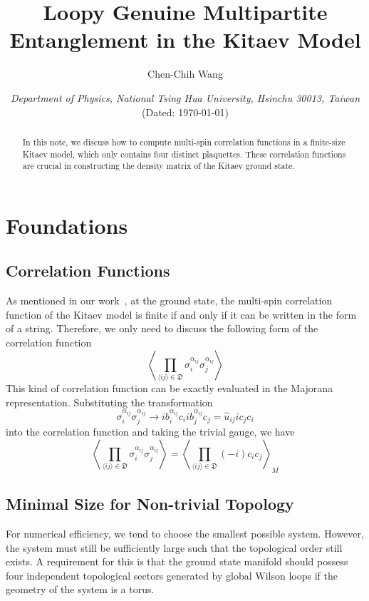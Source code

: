 \documentclass[12font]{article}
\title{\textbf{Loopy Genuine Multipartite Entanglement in the Kitaev Model}}
\author{Chen-Chih Wang  }
\date{\textit{Department of Physics, National Tsing Hua University, Hsinchu 30013, Taiwan} \\ (Dated: \today)}
\numberwithin{equation}{section}    %
\theoremstyle{definition}
\newcommand{\anglelr}[1]{\langle #1 \rangle}
\newcommand{\Anglelr}[1]{\left\langle #1 \right\rangle}
\newcommand{\dimer}[2]{\sigma_{#1}^{\alpha_{#1#2}}\sigma_{#2}^{\alpha_{#1#2}}}
\begin{document}
\maketitle
\renewcommand\qedsymbol{$\blacksquare$}



\fontsize{12pt}{16pt}\selectfont

\begin{abstract}
    In this note, we discuss how to compute multi-spin correlation functions in a finite-size Kitaev model, which only contains four distinct plaquettes. These correlation functions are crucial in constructing the density matrix of the Kitaev ground state.
\end{abstract}

\tableofcontents

\section{Foundations}

\subsection{Correlation Functions}
As mentioned in our work~\cite{wang2026exactorganizationdensitymatrices}, at the ground state, the multi-spin correlation function of the Kitaev model is finite if and only if it can be written in the form of a string. Therefore, we only need to discuss the following form of the correlation function
\[
\Anglelr{
    \prod_{\anglelr{ij}\in\mathfrak{D}}
    \dimer{i}{j}
}
\]
This kind of correlation function can be exactly evaluated in the Majorana representation. Substituting the transformation 
\[
\dimer{i}{j} \to i b^{\alpha_{ij}}_i c_i  i b^{\alpha_{ij}}_j c_j = \hat{u}_{ij} ic_jc_i
\]
into the correlation function and taking the trivial gauge, we have
\[
\Anglelr{
    \prod_{\anglelr{ij}\in\mathfrak{D}}
    \dimer{i}{j}
}
=
\Anglelr{
    \prod_{\anglelr{ij}\in\mathfrak{D}}
    (-i) c_ic_j
}_M
\]

\subsection{Minimal Size for Non-trivial Topology}
For numerical efficiency, we tend to choose the smallest possible system. However, the system must still be sufficiently large such that the topological order still exists. A requirement for this is that the ground state manifold should possess four independent topological sectors generated by global Wilson loops if the geometry of the system is a torus.
\end{document}
